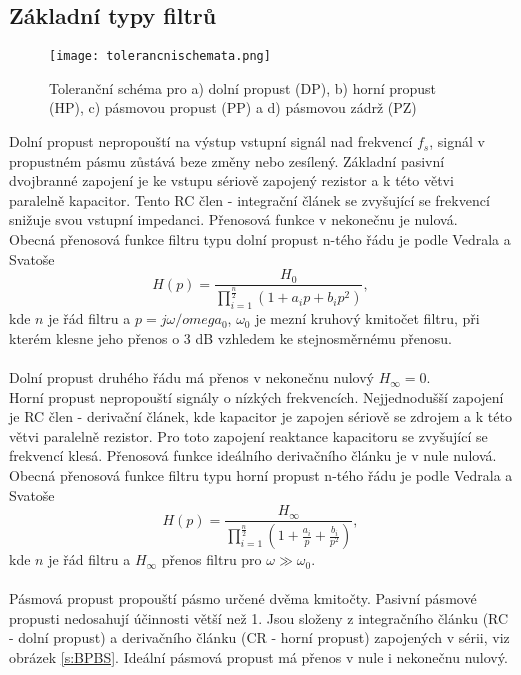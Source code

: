 \subsection{Základní typy filtrů}
\begin{figure}[h]
\centering
\texttt{[image: tolerancnischemata.png]}
\caption[Toleranční schéma dolní propusti (DP), horní propusti (HP), pásmové propusti (PP) a pásmové zádrže]{Toleranční schéma pro a) dolní propust (DP), b) horní propust (HP), c) pásmovou propust (PP) a d) pásmovou zádrž (PZ)\cite{7}}
\end{figure}
\noindent Dolní propust nepropouští na výstup vstupní signál nad frekvencí $f_s$, signál v propustném pásmu zůstává beze změny nebo zesílený. Základní pasivní dvojbranné zapojení je ke vstupu sériově zapojený rezistor a k této větvi paralelně kapacitor. Tento RC člen - integrační článek se zvyšující se frekvencí snižuje svou vstupní impedanci. Přenosová funkce v nekonečnu je nulová. \\
Obecná přenosová funkce filtru typu dolní propust n-tého řádu je podle Vedrala a Svatoše~\cite{19}
\begin{equation}
H(p) = \frac{H_0}{\prod_{i=1}^{\frac{n}{2}} (1 + a_i p + b_i p^2)} \label{r:FTR},
\end{equation}
kde $n$ je řád filtru a $p = j\omega/omega_0$, $\omega_0$ je mezní kruhový kmitočet filtru, při kterém klesne jeho přenos o 3 dB vzhledem ke stejnosměrnému přenosu.\\
\\
Dolní propust druhého řádu má přenos v nekonečnu nulový $H_{\infty} = 0$. \\
Horní propust nepropouští signály o nízkých frekvencích. Nejjednodušší zapojení je RC člen - derivační článek, kde kapacitor je zapojen sériově se zdrojem a k této větvi paralelně rezistor. Pro toto zapojení reaktance kapacitoru se zvyšující se frekvencí klesá. Přenosová funkce ideálního derivačního článku je v nule nulová. \\
Obecná přenosová funkce filtru typu horní propust n-tého řádu je podle Vedrala a Svatoše~\cite{19}
\begin{equation}
H(p) = \frac{H_{\infty}}{\prod_{i=1}^{\frac{n}{2}} (1 + \frac{a_i}{p} + \frac{b_i}{p^2})} \label{r:FTR2},
\end{equation}
kde $n$ je řád filtru a $H_{\infty}$ přenos filtru pro $\omega \gg \omega_0$.\\
\\
\noindent Pásmová propust propouští pásmo určené dvěma kmitočty. Pasivní pásmové propusti nedosahují účinnosti větší než 1. Jsou složeny z integračního článku (RC - dolní propust) a derivačního článku (CR - horní propust) zapojených v sérii, viz obrázek \ref{s:BPBS}. Ideální pásmová propust má přenos v nule i nekonečnu nulový. \\
